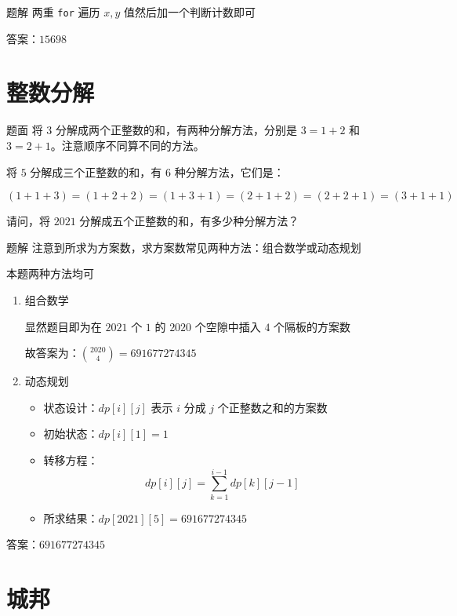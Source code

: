 \documentclass{pptt}
\begin{document}
\begin{frame}{题解}
    两重 \texttt{for} 遍历 $x,y$ 值然后加一个判断计数即可

    答案：$15698$
\end{frame}

\section{整数分解}

\begin{frame}{题面}
    将 $3$ 分解成两个正整数的和，有两种分解方法，分别是 $3=1+2$ 和 $3=2+1$。注意顺序不同算不同的方法。

    将 $5$ 分解成三个正整数的和，有 $6$ 种分解方法，它们是：
    
    $$(1+1+3) = (1+2+2) = (1+3+1) = (2+1+2) = (2+2+1) = (3+1+1)$$

    请问，将 $2021$ 分解成五个正整数的和，有多少种分解方法？
\end{frame}

\begin{frame}{题解}
    注意到所求为方案数，求方案数常见两种方法：组合数学或动态规划

    本题两种方法均可

    \begin{enumerate}
        \item 组合数学

              显然题目即为在 $2021$ 个 $1$ 的 $2020$ 个空隙中插入 $4$ 个隔板的方案数

              故答案为：$\binom{2020}{4}=691677274345$
        \item 动态规划
              \begin{itemize}
                  \item 状态设计：$dp[i][j]$ 表示 $i$ 分成 $j$ 个正整数之和的方案数
                  \item 初始状态：$dp[i][1] = 1$
                  \item 转移方程：$$dp[i][j] = \sum_{k=1}^{i-1} dp[k][j-1]$$
                  \item 所求结果：$dp[2021][5] = 691677274345$
              \end{itemize}
    \end{enumerate}

    答案：$691677274345$
\end{frame}

\section{城邦}
\end{document}
